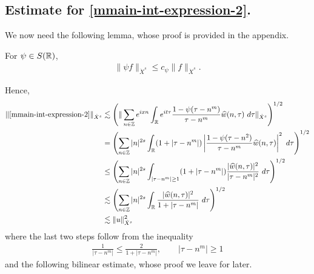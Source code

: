 \subsection{Estimate for
\texorpdfstring{\eqref{mmain-int-expression-2}}{Expression 2}.}
We now need the following lemma, whose proof is provided in the appendix.
%
%
%
%
%
%
%
%
\begin{lemma}
\label{mlem:schwartz-mult}
	For $\psi \in S(\mathbb{R})$,
%
%
\begin{equation}
	\label{mschwartz-mult}
	\begin{split}
		\|\psi f \|_{\dot{X}^s} \le c_{\psi} \|f \|_{\dot{X}^s}.
	\end{split}
\end{equation}
%
%
\end{lemma}
%
%
Hence,
%
%
\begin{equation}
	\label{mmain-int2-est-X-s-part}
	\begin{split}
		\|\eqref{mmain-int-expression-2}\|_{\dot{X}^s} 
		& \lesssim 
		\left( \| \sum_{n \in \zz} e^{ixn} \int_\rr 
		e^{it \tau} \frac{ 1 - \psi (\tau - n^m ) 
		}{\tau - n^m} \wh{w}(n, \tau) \ 
		d \tau\|_{\dot{X}^s} \right)^{1/2}
		\\
		& =  \left( \sum_{n \in \zz} |n|^{2s} \int_\rr
		(1 + |\tau - n^m|) \left | \frac{1 - \psi(\tau - n^{2 
		})}{\tau - n^m} 
		\wh{w}(n, \tau) \right |^2 \ d 
		\tau \right)^{1/2}
		\\
		& \le \left( \sum_{n \in \zz} |n|^{2s} \int_{| \tau - n^m| \ge 1}
		(1 + |\tau - n^m|) \frac{|\wh{w}(n, \tau)|^2 }{|\tau - n^m|^2} 
		\ d 
		\tau \right)^{1/2}
		\\
		& \lesssim  \left( \sum_{n \in 
		\zz} |n|^{2s} \int_\rr
		\frac{|\wh{w}(n, \tau) |^2}{1+ |\tau - 
		n^m|} 
		 \ d \tau 
		\right)^{1/2}
		\\
		& \lesssim  \|u\|_{\dot{X}^s}^2
	\end{split}
\end{equation}
%
%
where the last two steps follow from the inequality 
%
\begin{equation}
	\label{mone-plus-ineq}
	\begin{split}
		\frac{1}{|\tau - n^m| } \le \frac{2}{1 + |\tau - n^m| }, 
		\qquad |\tau - n^m| \ge 1
	\end{split}
\end{equation}
%
%
and the following bilinear estimate, whose proof we leave for later.
%
